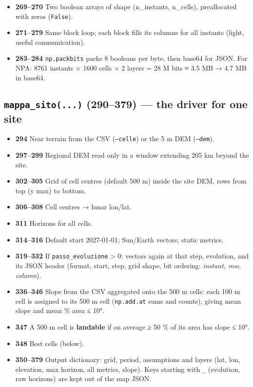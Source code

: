 \documentclass[11pt,a4paper]{article}
\providecommand{\tightlist}{\setlength{\itemsep}{0pt}\setlength{\parskip}{0pt}}
\begin{document}
\begin{itemize}
\tightlist
\item
  \textbf{269--270} Two boolean arrays of shape (n\_instants, n\_cells),
  preallocated with zeros (\texttt{False}).
\item
  \textbf{271--279} Same block loop; each block fills its columns for
  all instants (light, useful communication).
\item
  \textbf{283--284} \texttt{np.packbits} packs 8
  booleans per byte, then base64 for JSON. For NPA: 8761 instants × 1600
  cells × 2 layers = 28 M bits ≈ 3.5 MB → 4.7 MB in base64.
\end{itemize}

\hypertarget{mappa_sito...-290379-the-driver-for-one-site}{%
\subsection{\texorpdfstring{\texttt{mappa\_sito(...)} (290--379) --- the
driver for one
site}{mappa\_sito(...) (290--379) --- the driver for one site}}\label{mappa_sito...-290379-the-driver-for-one-site}}

\begin{itemize}
\tightlist
\item
  \textbf{294} Near terrain from the CSV
  (\texttt{--celle}) or the 5 m DEM
  (\texttt{--dem}).
\item
  \textbf{297--299} Regional DEM read only in a window extending 205 km
  beyond the site.
\item
  \textbf{302--305} Grid of cell centres (default 500 m) inside the site
  DEM, rows from top (y max) to bottom.
\item
  \textbf{306--308} Cell centres → lunar lon/lat.
\item
  \textbf{311} Horizons for all cells.
\item
  \textbf{314--316} Default start 2027-01-01; Sun/Earth vectors; static
  metrics.
\item
  \textbf{319--332} If \texttt{passo\_evoluzione}
  \textgreater{} 0: vectors again at that step, evolution, and its JSON
  header (format, start, step, grid shape, bit ordering: \emph{instant,
  row, column}).
\item
  \textbf{336--346} Slope from the CSV aggregated onto the 500 m cells:
  each 100 m cell is assigned to its 500 m cell
  (\texttt{np.add.at} sums and counts), giving mean
  slope and mean \% area ≤ 10°.
\item
  \textbf{347} A 500 m cell is \textbf{landable} if on average ≥ 50 \%
  of its area has slope ≤ 10°.
\item
  \textbf{348} Best cells (below).
\item
  \textbf{350--379} Output dictionary: grid, period, assumptions and
  layers (lat, lon, elevation, max horizon, all metrics, slope). Keys
  starting with \texttt{\_} (evolution, raw horizons)
  are kept out of the map JSON.
\end{itemize}
\end{document}
